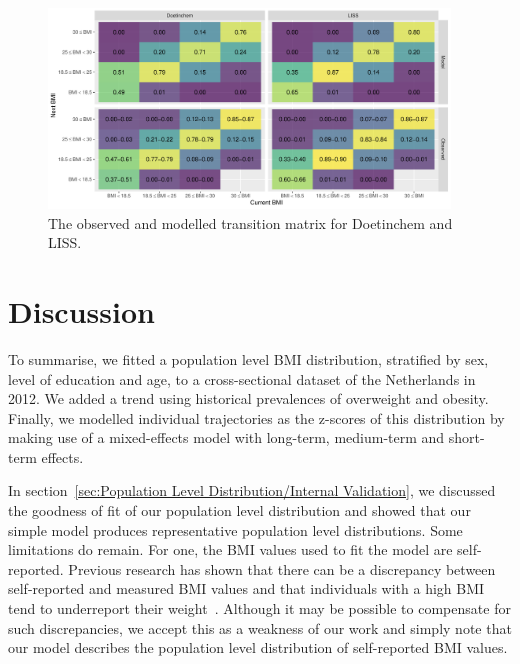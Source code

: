 \documentclass{imammb}
\numberwithin{equation}{section}
\begin{document}
\vspace{-4mm}

\begin{figure}[!h]
\centering\includegraphics[width=0.95\textwidth] {"Figures/Transition Matrices.pdf"}
\caption{The observed and modelled transition matrix for Doetinchem and LISS.}
\label{fig:Transition Matrices}
\vspace*{-9pt}
\end{figure}

\section{Discussion}
\label{sec:Discussion}

To summarise, we fitted a population level BMI distribution, stratified by sex, level of education and age, to a cross-sectional dataset of the Netherlands in 2012. We added a trend using historical prevalences of overweight and obesity. Finally, we modelled individual trajectories as the z-scores of this distribution by making use of a mixed-effects model with long-term, medium-term and short-term effects.

In section~\ref{sec:Population Level Distribution/Internal Validation}, we discussed the goodness of fit of our population level distribution and showed that our simple model produces representative population level distributions. Some limitations do remain. For one, the BMI values used to fit the model are self-reported. Previous research has shown that there can be a discrepancy between self-reported and measured BMI values and that individuals with a high BMI tend to underreport their weight~\citep{Olfert2018}. Although it may be possible to compensate for such discrepancies, we accept this as a weakness of our work and simply note that our model describes the population level distribution of self-reported BMI values.
\end{document}
